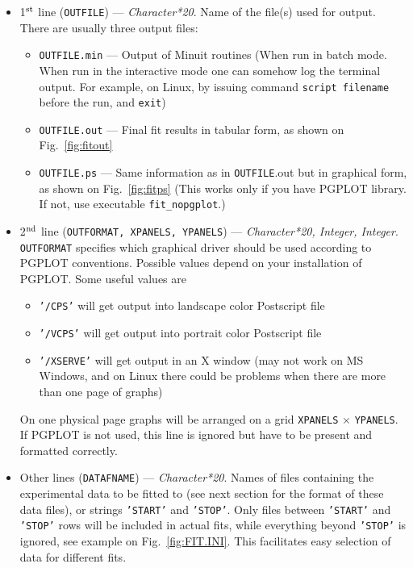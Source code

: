 \documentclass[12pt]{article}
\begin{document}
\begin{itemize}

\item
1$^{\rm st}$ line (\texttt{OUTFILE}) --- \emph{Character*20}. Name of the file(s) used for output.
There are usually three output files:
\begin{itemize}
\item \texttt{OUTFILE.min}  ---  Output of Minuit routines (When run in batch mode. When
run in the interactive mode one can somehow log the terminal output. For example,
on Linux, by issuing command \texttt{script filename} before the run, and
\texttt{exit})
\item \texttt{OUTFILE.out}   ---  Final fit results in tabular form, as shown on
Fig.~\ref{fig:fitout}
\item \texttt{OUTFILE.ps}    ---  Same information as in \texttt{OUTFILE}.out but 
in graphical form, as shown on
Fig.~\ref{fig:fitps}  (This works only if you have PGPLOT library. If not, use
executable \texttt{fit\_nopgplot}.)
\end{itemize}

\item 
2$^{\rm nd}$ line (\texttt{OUTFORMAT, XPANELS, YPANELS}) ---  \emph{Character*20, Integer, Integer}.
\texttt{OUTFORMAT} specifies which graphical driver should be used according to PGPLOT conventions. Possible
values depend on your installation of PGPLOT. Some useful values are
  \begin{itemize}
  \item \texttt{'/CPS'}  will get output into landscape color Postscript file 
  \item \texttt{'/VCPS'}  will get output into portrait color Postscript file 
  \item \texttt{'/XSERVE'} will get output in an X window (may not work on MS Windows, and
   on Linux there could be problems when there are more than one page of graphs)
  \end{itemize}
On one physical page graphs will be arranged on a grid \texttt{XPANELS} 
$\times$ \texttt{YPANELS}.
If PGPLOT is not used, this line is ignored but have to be present and formatted correctly.

\item
Other lines (\texttt{DATAFNAME}) --- \emph{Character*20}. Names of
files containing the experimental data to be fitted to (see next
section for the format of these data files), or strings \texttt{'START'} and \texttt{'STOP'}. 
Only files between \texttt{'START'}
and \texttt{'STOP'} rows will be included in actual fits, while everything beyond
\texttt{'STOP'} is ignored, see example on Fig.~\ref{fig:FIT.INI}.
This facilitates easy selection of data for different fits.
\end{itemize}
\end{document}
